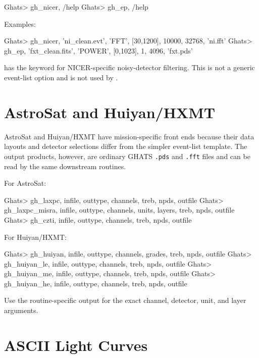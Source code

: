 \begin{ghatsconsole}
Ghats> gh_nicer, /help
Ghats> gh_ep, /help
\end{ghatsconsole}

Examples:

\begin{ghatsconsole}
Ghats> gh_nicer, 'ni_clean.evt', 'FFT', [30,1200], 10000, 32768, 'ni.fft'
Ghats> gh_ep, 'fxt_clean.fits', 'POWER', [0,1023], 1, 4096, 'fxt.pds'
\end{ghatsconsole}

\begin{ghatsnote}
 has the keyword  for NICER-specific
noisy-detector filtering.  This is not a generic event-list option and is not
used by .
\end{ghatsnote}

\section{AstroSat and Huiyan/HXMT}

AstroSat and Huiyan/HXMT have mission-specific front ends because their data
layouts and detector selections differ from the simpler event-list template.
The output products, however, are ordinary GHATS \texttt{.pds} and
\texttt{.fft} files and can be read by the same downstream routines.

For AstroSat:

\begin{ghatsconsole}
Ghats> gh_laxpc, infile, outtype, channels, treb, npds, outfile
Ghats> gh_laxpc_misra, infile, outtype, channels, units, layers, treb, npds, outfile
Ghats> gh_czti, infile, outtype, channels, treb, npds, outfile
\end{ghatsconsole}

For Huiyan/HXMT:

\begin{ghatsconsole}
Ghats> gh_huiyan, infile, outtype, channels, grades, treb, npds, outfile
Ghats> gh_huiyan_le, infile, outtype, channels, treb, npds, outfile
Ghats> gh_huiyan_me, infile, outtype, channels, treb, npds, outfile
Ghats> gh_huiyan_he, infile, outtype, channels, treb, npds, outfile
\end{ghatsconsole}

Use the routine-specific  output for the exact channel,
detector, unit, and layer arguments.

\section{ASCII Light Curves}

